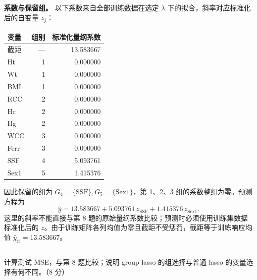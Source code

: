 \documentclass[12pt,a4paper]{article}
\begin{document}
\begin{answerbox}
\textbf{系数与保留组。} 以下系数来自全部训练数据在选定 $\lambda$ 下的拟合，斜率对应标准化后的自变量 $z_j$：
\begin{center}
\begin{tabular}{lrr}
\toprule
变量 & 组别 & 标准化量纲系数 \\
\midrule
截距 & --- & 13.583667 \\
Ht & 1 & 0.000000 \\
Wt & 1 & 0.000000 \\
BMI & 1 & 0.000000 \\
RCC & 2 & 0.000000 \\
Hc & 2 & 0.000000 \\
Hg & 2 & 0.000000 \\
WCC & 3 & 0.000000 \\
Ferr & 3 & 0.000000 \\
SSF & 4 & 5.093761 \\
Sex1 & 5 & 1.415376 \\
\bottomrule
\end{tabular}
\end{center}
因此保留的组为 $G_4=\{\mathrm{SSF}\}, G_5=\{\mathrm{Sex1}\}$，第 1、2、3 组的系数整组为零。预测方程为
$$
\hat y=13.583667+5.093761\,z_{\mathrm{SSF}}
+1.415376\,z_{\mathrm{Sex1}}.
$$
这里的斜率不能直接与第 8 题的原始量纲系数比较；预测时必须使用训练集数据标准化后的 $z$。由于训练矩阵各列均值为零且截距不受惩罚，截距等于训练响应均值 $\bar y_{\mathrm{tr}}=13.583667$。
\end{answerbox}

\subsection{}

计算测试 MSE，与第 8 题比较；说明 group lasso 的组选择与普通 lasso 的变量选择有何不同。（8 分）
\end{document}
